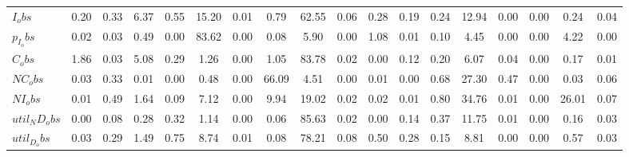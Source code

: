 \begin{center}
\begin{longtable}{lccccccccccccccccc}
$I_obs        $	 & 	            0.20	 & 	            0.33	 & 	            6.37	 & 	            0.55	 & 	           15.20	 & 	            0.01	 & 	            0.79	 & 	           62.55	 & 	            0.06	 & 	            0.28	 & 	            0.19	 & 	            0.24	 & 	           12.94	 & 	            0.00	 & 	            0.00	 & 	            0.24	 & 	            0.04 \\ 
$p_I_obs      $	 & 	            0.02	 & 	            0.03	 & 	            0.49	 & 	            0.00	 & 	           83.62	 & 	            0.00	 & 	            0.08	 & 	            5.90	 & 	            0.00	 & 	            1.08	 & 	            0.01	 & 	            0.10	 & 	            4.45	 & 	            0.00	 & 	            0.00	 & 	            4.22	 & 	            0.00 \\ 
$C_obs        $	 & 	            1.86	 & 	            0.03	 & 	            5.08	 & 	            0.29	 & 	            1.26	 & 	            0.00	 & 	            1.05	 & 	           83.78	 & 	            0.02	 & 	            0.00	 & 	            0.12	 & 	            0.20	 & 	            6.07	 & 	            0.04	 & 	            0.00	 & 	            0.17	 & 	            0.01 \\ 
$NC_obs       $	 & 	            0.03	 & 	            0.33	 & 	            0.01	 & 	            0.00	 & 	            0.48	 & 	            0.00	 & 	           66.09	 & 	            4.51	 & 	            0.00	 & 	            0.01	 & 	            0.00	 & 	            0.68	 & 	           27.30	 & 	            0.47	 & 	            0.00	 & 	            0.03	 & 	            0.06 \\ 
$NI_obs       $	 & 	            0.01	 & 	            0.49	 & 	            1.64	 & 	            0.09	 & 	            7.12	 & 	            0.00	 & 	            9.94	 & 	           19.02	 & 	            0.02	 & 	            0.02	 & 	            0.01	 & 	            0.80	 & 	           34.76	 & 	            0.01	 & 	            0.00	 & 	           26.01	 & 	            0.07 \\ 
$util_ND_obs  $	 & 	            0.00	 & 	            0.08	 & 	            0.28	 & 	            0.32	 & 	            1.14	 & 	            0.00	 & 	            0.06	 & 	           85.63	 & 	            0.02	 & 	            0.00	 & 	            0.14	 & 	            0.37	 & 	           11.75	 & 	            0.01	 & 	            0.00	 & 	            0.16	 & 	            0.03 \\ 
$util_D_obs   $	 & 	            0.03	 & 	            0.29	 & 	            1.49	 & 	            0.75	 & 	            8.74	 & 	            0.01	 & 	            0.08	 & 	           78.21	 & 	            0.08	 & 	            0.50	 & 	            0.28	 & 	            0.15	 & 	            8.81	 & 	            0.00	 & 	            0.00	 & 	            0.57	 & 	            0.03 \\ 

\end{longtable}
\end{center}
